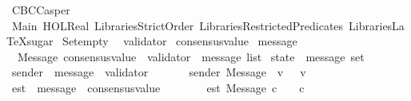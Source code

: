 %
\begin{isabellebody}%
%
%
\isadelimdocument
%
\endisadelimdocument
%
\isatagdocument
%
\isamarkuptrue%
%
\endisatagdocument
{\isafolddocument}%
%
\isadelimdocument
%
\endisadelimdocument
%
\isadelimtheory
%
\endisadelimtheory
%
\isatagtheory
{}\isamarkupfalse%
\ CBCCasper\isanewline
\isanewline
{}\ Main\ HOL{\isachardot}Real\ {\isachardoublequoteopen}Libraries{\isacharslash}Strict{\isacharunderscore}Order{\isachardoublequoteclose}\ {\isachardoublequoteopen}Libraries{\isacharslash}Restricted{\isacharunderscore}Predicates{\isachardoublequoteclose}\ {\isachardoublequoteopen}Libraries{\isacharslash}LaTeXsugar{\isachardoublequoteclose}\isanewline
\isanewline
{}%
\endisatagtheory
{\isafoldtheory}%
%
\isadelimtheory
\isanewline
%
\endisadelimtheory
\isanewline
\isanewline
\isanewline
\isanewline
\isanewline
\isanewline
\isanewline
\isanewline
{}\isamarkupfalse%
\ Set{\isachardot}empty\ {\isacharparenleft}{\isachardoublequoteopen}{\isasymemptyset}{\isachardoublequoteclose}{\isacharparenright}\isanewline
\isanewline
\isanewline
{}\isamarkupfalse%
\ validator\isanewline
\isanewline
{}\isamarkupfalse%
\ consensus{\isacharunderscore}value\isanewline
\isanewline
\isanewline
{}\isamarkupfalse%
\ message\ {\isacharequal}\isanewline
\ \ Message\ {\isachardoublequoteopen}consensus{\isacharunderscore}value\ {\isacharasterisk}\ validator\ {\isacharasterisk}\ message\ list{\isachardoublequoteclose}\isanewline
\isanewline
{}\isamarkupfalse%
\ state\ {\isacharequal}\ {\isachardoublequoteopen}message\ set{\isachardoublequoteclose}\isanewline
\isanewline
\isanewline
\isanewline
{}\isamarkupfalse%
\ sender\ {\isacharcolon}{\isacharcolon}\ {\isachardoublequoteopen}message\ {\isasymRightarrow}\ validator{\isachardoublequoteclose}\isanewline
\ \ \isanewline
\ \ \ \ {\isachardoublequoteopen}sender\ {\isacharparenleft}Message\ {\isacharparenleft}{\isacharunderscore}{\isacharcomma}\ v{\isacharcomma}\ {\isacharunderscore}{\isacharparenright}{\isacharparenright}\ {\isacharequal}\ v{\isachardoublequoteclose}\isanewline
\isanewline
{}\isamarkupfalse%
\ est\ {\isacharcolon}{\isacharcolon}\ {\isachardoublequoteopen}message\ {\isasymRightarrow}\ consensus{\isacharunderscore}value{\isachardoublequoteclose}\isanewline
\ \ \isanewline
\ \ \ \ \ {\isachardoublequoteopen}est\ {\isacharparenleft}Message\ {\isacharparenleft}c{\isacharcomma}\ {\isacharunderscore}{\isacharcomma}\ {\isacharunderscore}{\isacharparenright}{\isacharparenright}\ {\isacharequal}\ c{\isachardoublequoteclose}\isanewline

\end{isabellebody}
